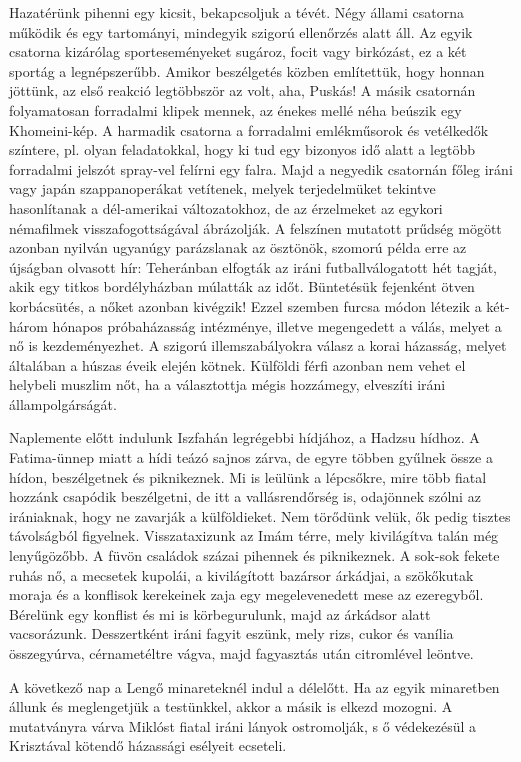 Hazatérünk pihenni egy kicsit, bekapcsoljuk a tévét. Négy állami
csatorna működik és egy tartományi, mindegyik szigorú ellenőrzés
alatt áll. Az egyik csatorna kizárólag sporteseményeket sugároz, focit
vagy birkózást, ez a két sportág a legnépszerűbb. Amikor beszélgetés
közben említettük, hogy honnan jöttünk, az első reakció legtöbbször
az volt, aha, Puskás! A másik csatornán folyamatosan forradalmi klipek
mennek, az énekes mellé néha beúszik egy Khomeini-kép. A harmadik
csatorna a forradalmi emlékműsorok és vetélkedők színtere, pl.
olyan feladatokkal, hogy ki tud egy bizonyos idő alatt a legtöbb forradalmi
jelszót spray-vel felírni egy falra. Majd a negyedik csatornán főleg
iráni vagy japán szappanoperákat vetítenek, melyek terjedelmüket
tekintve hasonlítanak a dél-amerikai változatokhoz, de az érzelmeket
az egykori némafilmek visszafogottságával ábrázolják. A felszínen
mutatott prűdség mögött azonban nyilván ugyanúgy parázslanak az
ösztönök, szomorú példa erre az újságban olvasott hír: Teheránban elfogták
az iráni futballválogatott hét tagját, akik egy titkos bordélyházban
múlatták az időt. Büntetésük fejenként ötven korbácsütés, a nőket
azonban kivégzik! Ezzel szemben furcsa módon létezik a két-három
hónapos próbaházasság intézménye, illetve megengedett a válás, melyet
a nő is kezdeményezhet. A szigorú illemszabályokra válasz a korai
házasság, melyet általában a húszas éveik elején kötnek. Külföldi férfi
azonban nem vehet el helybeli muszlim nőt, ha a választottja mégis
hozzámegy, elveszíti iráni állampolgárságát.

Naplemente előtt indulunk Iszfahán legrégebbi hídjához, a Hadzsu
hídhoz. A Fatima-ünnep miatt a hídi teázó sajnos zárva, de egyre többen
gyűlnek össze a hídon, beszélgetnek és piknikeznek. Mi is leülünk
a lépcsőkre, mire több fiatal hozzánk csapódik beszélgetni, de itt a
vallásrendőrség is, odajönnek szólni az irániaknak, hogy ne zavarják a
külföldieket. Nem törődünk velük, ők pedig tisztes távolságból figyelnek.
Visszataxizunk az Imám térre, mely kivilágítva talán még lenyűgözőbb.
A füvön családok százai pihennek és piknikeznek. A sok-sok
fekete ruhás nő, a mecsetek kupolái, a kivilágított bazársor árkádjai,
a szökőkutak moraja és a konflisok kerekeinek zaja egy megelevenedett
mese az ezeregyből. Bérelünk egy konflist és mi is körbegurulunk,
majd az árkádsor alatt vacsorázunk. Desszertként iráni fagyit eszünk,
mely rizs, cukor és vanília összegyúrva, cérnametéltre vágva, majd
fagyasztás után citromlével leöntve.

A következő nap a Lengő minareteknél indul a délelőtt. Ha az egyik
minaretben állunk és meglengetjük a testünkkel, akkor a másik is elkezd
mozogni. A mutatványra várva Miklóst fiatal iráni lányok ostromolják,
s ő védekezésül a Krisztával kötendő házassági esélyeit ecseteli.

